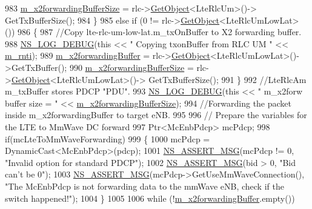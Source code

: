\begin{DoxyCode}
983     \hyperlink{classns3_1_1UeManager_af9b888fa844a79c14b46c50ebae65031}{m\_x2forwardingBufferSize} =  rlc->\hyperlink{classns3_1_1Object_a13e18c00017096c8381eb651d5bd0783}{GetObject}<LteRlcUm>()->
      GetTxBufferSize();
984   \}
985   \textcolor{keywordflow}{else} \textcolor{keywordflow}{if} (0 != rlc->\hyperlink{classns3_1_1Object_a13e18c00017096c8381eb651d5bd0783}{GetObject}<LteRlcUmLowLat> ())
986   \{
987     \textcolor{comment}{//Copy lte-rlc-um-low-lat.m\_txOnBuffer to X2 forwarding buffer.}
988     \hyperlink{group__logging_ga413f1886406d49f59a6a0a89b77b4d0a}{NS\_LOG\_DEBUG}(\textcolor{keyword}{this} << \textcolor{stringliteral}{" Copying txonBuffer from RLC UM "} << 
      \hyperlink{classns3_1_1UeManager_a5a72b4fe818f21993bd7f05d7e2c4f83}{m\_rnti});
989     \hyperlink{classns3_1_1UeManager_a3fb8a9dc6ef434306f90f42837f3ae83}{m\_x2forwardingBuffer} = rlc->\hyperlink{classns3_1_1Object_a13e18c00017096c8381eb651d5bd0783}{GetObject}<LteRlcUmLowLat>()->GetTxBuffer();
990     \hyperlink{classns3_1_1UeManager_af9b888fa844a79c14b46c50ebae65031}{m\_x2forwardingBufferSize} =  rlc->\hyperlink{classns3_1_1Object_a13e18c00017096c8381eb651d5bd0783}{GetObject}<LteRlcUmLowLat>()->
      GetTxBufferSize();
991   \}
992   \textcolor{comment}{//LteRlcAm m\_txBuffer stores PDCP "PDU".}
993   \hyperlink{group__logging_ga413f1886406d49f59a6a0a89b77b4d0a}{NS\_LOG\_DEBUG}(\textcolor{keyword}{this} << \textcolor{stringliteral}{" m\_x2forw buffer size = "} << 
      \hyperlink{classns3_1_1UeManager_af9b888fa844a79c14b46c50ebae65031}{m\_x2forwardingBufferSize});
994     \textcolor{comment}{//Forwarding the packet inside m\_x2forwardingBuffer to target eNB. }
995 
996   \textcolor{comment}{// Prepare the variables for the LTE to MmWave DC forward}
997   Ptr<McEnbPdcp> mcPdcp;
998   \textcolor{keywordflow}{if}(mcLteToMmWaveForwarding)
999   \{
1000     mcPdcp = DynamicCast<McEnbPdcp>(pdcp);
1001     \hyperlink{assert_8h_aff5ece9066c74e681e74999856f08539}{NS\_ASSERT\_MSG}(mcPdcp != 0, \textcolor{stringliteral}{"Invalid option for standard PDCP"});
1002     \hyperlink{assert_8h_aff5ece9066c74e681e74999856f08539}{NS\_ASSERT\_MSG}(bid > 0, \textcolor{stringliteral}{"Bid can't be 0"});
1003     \hyperlink{assert_8h_aff5ece9066c74e681e74999856f08539}{NS\_ASSERT\_MSG}(mcPdcp->GetUseMmWaveConnection(), \textcolor{stringliteral}{"The McEnbPdcp is not forwarding data to
       the mmWave eNB, check if the switch happened!"});
1004   \}
1005 
1006   \textcolor{keywordflow}{while} (!\hyperlink{classns3_1_1UeManager_a3fb8a9dc6ef434306f90f42837f3ae83}{m\_x2forwardingBuffer}.empty())

\end{DoxyCode}
